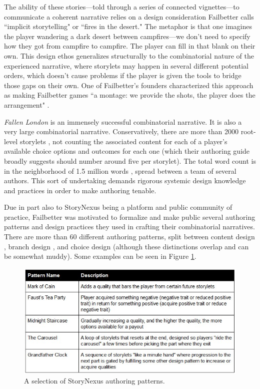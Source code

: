 The ability of these stories---told through a series of connected vignettes---to communicate a coherent narrative relies on a design consideration Failbetter calls ``implicit storytelling" or ``fires in the desert." The metaphor is that one imagines the player wandering a dark desert between campfires---we don't need to specify how they got from campfire to campfire. The player can fill in that blank on their own. This design ethos generalizes structurally to the combinatorial nature of the experienced narrative, where storylets may happen in several different potential orders, which doesn't cause problems if the player is given the tools to bridge those gaps on their own. One of Failbetter's founders characterized this approach as making Failbetter games ``a montage: we provide the shots, the player does the arrangement" \cite{arendt_structuresThree}.

\textit{Fallen London} is an immensely successful combinatorial narrative. It is also a very large combinatorial narrative. Conservatively, there are more than 2000 root-level storylets \cite{fallen_london_wiki}, not counting the associated content for each of a player's available choice options and outcomes for each one (which their authoring guide broadly suggests should number around five per storylet). The total word count is in the neighborhood of 1.5 million words \cite{failbetter_ftp}, spread between a team of several authors. This sort of undertaking demands rigorous systemic design knowledge and practices in order to make authoring tenable.

Due in part also to StoryNexus being a platform and public community of practice, Failbetter was motivated to formalize and make public several authoring patterns and design practices they used in crafting their combinatorial narratives. There are more than 60 different authoring patterns, split between content design \cite{storyChoices_contentDesign}, branch design \cite{storychoices_branchDesign}, and choice design \cite{storyChoices_choiceDesign} (although these distinctions overlap and can be somewhat muddy). Some examples can be seen in Figure \ref{fig:storynexus-patterns}.



\begin{figure}
    \centering
    \includegraphics[width=\textwidth]{figures/2-Ice-Bound/storynexus-patterns.jpg}
    \caption{A selection of StoryNexus authoring patterns.}
    \label{fig:storynexus-patterns}
\end{figure}

